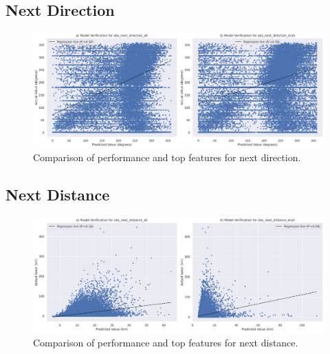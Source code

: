 \subsection{Next Direction}

\begin{figure}[ht]
    \centering
    \includegraphics[width=\textwidth]{../figures/generated/experiments/obs_next_direction/obs_next_direction_summary.png}
    \caption{Comparison of performance and top features for next direction.}
    \label{fig:obs_direction_summary}
\end{figure}

\subsection{Next Distance}

\begin{figure}[ht]
    \centering
    \includegraphics[width=\textwidth]{../figures/generated/experiments/obs_next_distance/obs_next_distance_summary.png}
    \caption{Comparison of performance and top features for next distance.}
    \label{fig:obs_distance_summary}
\end{figure}